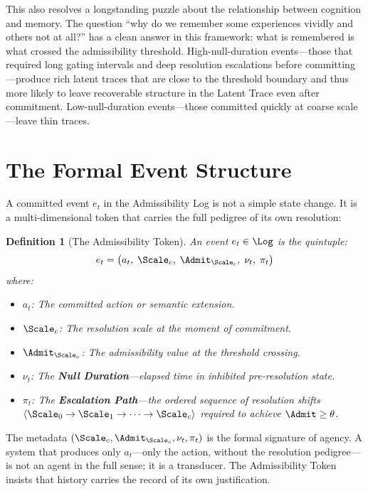 \documentclass[11pt,oneside]{book}
\newtheorem{definition}{Definition}[chapter]
\begin{document}
This also resolves a longstanding puzzle about the relationship between cognition and memory. The question ``why do we remember some experiences vividly and others not at all?'' has a clean answer in this framework: what is remembered is what crossed the admissibility threshold. High-null-duration events---those that required long gating intervals and deep resolution escalations before committing---produce rich latent traces that are close to the threshold boundary and thus more likely to leave recoverable structure in the Latent Trace even after commitment. Low-null-duration events---those committed quickly at coarse scale---leave thin traces.

\section{The Formal Event Structure}

A committed event $e_t$ in the Admissibility Log is not a simple state change. It is a multi-dimensional token that carries the full pedigree of its own resolution:

\begin{definition}[The Admissibility Token]
An event $e_t \in \Log$ is the quintuple:
\begin{equation}
    e_t = \bigl(a_t,\; \Scale_c,\; \Admit_{\Scale_c},\; \nu_t,\; \pi_t\bigr)
\end{equation}
where:
\begin{itemize}
    \item $a_t$: The committed action or semantic extension.
    \item $\Scale_c$: The resolution scale at the moment of commitment.
    \item $\Admit_{\Scale_c}$: The admissibility value at the threshold crossing.
    \item $\nu_t$: The \textbf{Null Duration}---elapsed time in inhibited pre-resolution state.
    \item $\pi_t$: The \textbf{Escalation Path}---the ordered sequence of resolution shifts $\langle \Scale_0 \to \Scale_1 \to \cdots \to \Scale_c \rangle$ required to achieve $\Admit \ge \theta$.
\end{itemize}
\end{definition}

The metadata $(\Scale_c, \Admit_{\Scale_c}, \nu_t, \pi_t)$ is the formal signature of agency. A system that produces only $a_t$---only the action, without the resolution pedigree---is not an agent in the full sense; it is a transducer. The Admissibility Token insists that history carries the record of its own justification.
\end{document}
